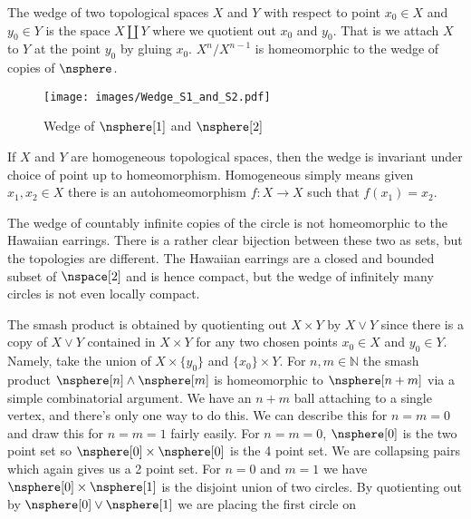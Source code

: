         The wedge of two topological spaces $X$ and $Y$ with respect to
        point $x_{0}\in{X}$ and $y_{0}\in{Y}$ is the space
        $X\coprod{Y}$ where we quotient out $x_{0}$ and $y_{0}$. That is
        we attach $X$ to $Y$ at the point $y_{0}$ by gluing $x_{0}$.
        $X^{n}/X^{n-1}$ is homeomorphic to the wedge of copies of
        $\nsphere$.
        \begin{figure}[H]
            \centering
            \captionsetup{type=figure}
            \texttt{[image: images/Wedge\_S1\_and\_S2.pdf]}
            \caption{Wedge of $\nsphere[1]$ and $\nsphere[2]$}
            \label{fig:Wedge_S1_and_S2}
        \end{figure}
        If $X$ and $Y$ are homogeneous topological spaces, then the
        wedge is invariant under choice of point up to homeomorphism.
        Homogeneous simply means given $x_{1},x_{2}\in{X}$ there is an
        autohomeomorphism $f:X\rightarrow{X}$ such that
        $f(x_{1})=x_{2}$.
        \par\hfill\par
        The wedge of countably infinite copies of the circle is not
        homeomorphic to the Hawaiian earrings. There is a rather clear
        bijection between these two as sets, but the topologies are
        different. The Hawaiian earrings are a closed and bounded subset
        of $\nspace[2]$ and is hence compact, but the wedge of
        infinitely many circles is not even locally compact.
        \par\hfill\par
        The smash product is obtained by quotienting out $X\times{Y}$ by
        $X\lor{Y}$ since there is a copy of $X\lor{Y}$ contained in
        $X\times{Y}$ for any two chosen points $x_{0}\in{X}$ and
        $y_{0}\in{Y}$. Namely, take the union of $X\times\{y_{0}\}$ and
        $\{x_{0}\}\times{Y}$. For $n,m\in\mathbb{N}$ the smash product
        $\nsphere[n]\land\nsphere[m]$ is homeomorphic to $\nsphere[n+m]$
        via a simple combinatorial argument. We have an $n+m$ ball
        attaching to a single vertex, and there's only one way to do
        this. We can describe this for $n=m=0$ and draw this for
        $n=m=1$ fairly easily. For $n=m=0$, $\nsphere[0]$ is the two
        point set so $\nsphere[0]\times\nsphere[0]$ is the 4 point set.
        We are collapsing pairs which again gives us a 2 point set. For
        $n=0$ and $m=1$ we have $\nsphere[0]\times\nsphere[1]$ is the
        disjoint union of two circles. By quotienting out by
        $\nsphere[0]\lor\nsphere[1]$ we are placing the first circle on
